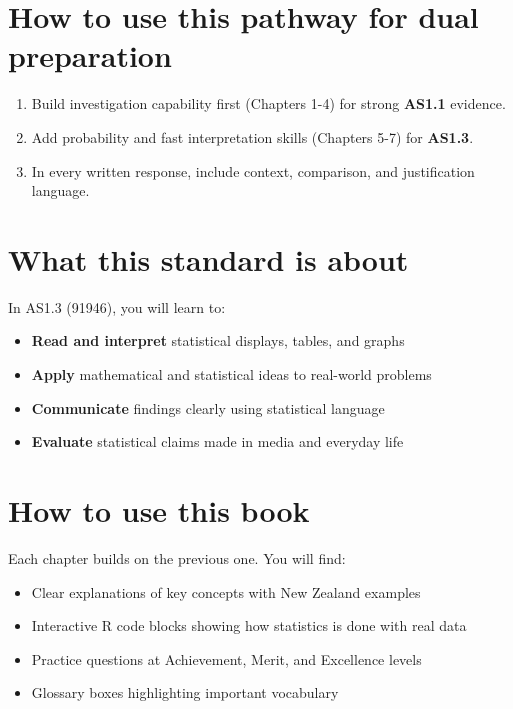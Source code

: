 \documentclass[
  11pt,
  a4paper,
  oneside,
  open=any]{scrbook}
\providecommand{\tightlist}{%
  \setlength{\itemsep}{0pt}\setlength{\parskip}{0pt}}
\begin{document}
\section{How to use this pathway for dual
preparation}\label{how-to-use-this-pathway-for-dual-preparation}

\begin{enumerate}
\def\labelenumi{\arabic{enumi}.}
\tightlist
\item
  Build investigation capability first (Chapters 1-4) for strong
  \textbf{AS1.1} evidence.
\item
  Add probability and fast interpretation skills (Chapters 5-7) for
  \textbf{AS1.3}.
\item
  In every written response, include context, comparison, and
  justification language.
\end{enumerate}

\section{What this standard is about}\label{what-this-standard-is-about}

In AS1.3 (91946), you will learn to:

\begin{itemize}
\tightlist
\item
  \textbf{Read and interpret} statistical displays, tables, and graphs
\item
  \textbf{Apply} mathematical and statistical ideas to real-world
  problems
\item
  \textbf{Communicate} findings clearly using statistical language
\item
  \textbf{Evaluate} statistical claims made in media and everyday life
\end{itemize}

\section{How to use this book}\label{how-to-use-this-book}

Each chapter builds on the previous one. You will find:

\begin{itemize}
\tightlist
\item
  Clear explanations of key concepts with New Zealand examples
\item
  Interactive R code blocks showing how statistics is done with real
  data
\item
  Practice questions at Achievement, Merit, and Excellence levels
\item
  Glossary boxes highlighting important vocabulary
\end{itemize}
\end{document}
